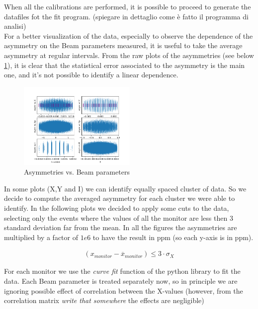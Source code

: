 {When all the calibrations are performed, it is possible to proceed to generate the datafiles fot the fit program. (spiegare in dettaglio come è fatto il programma di analisi)\\
For a better visualization of the data, especially to observe the dependence of the asymmetry on the Beam parameters measured, it is useful to take the average asymmetry at regular intervals. From the raw plots of the asymmetries (see below \ref{fig:asyvsparam}), it is clear that the statistical error associated to the asymmetry is the main one, and it's not possible to identify a linear dependence.

\begin{figure}[hbtp]
\centering
\includegraphics[width = 0.5\textwidth]{Analysis/Asym_vs_monitor.png}
\caption{Asymmetries vs. Beam parameters}
\label{fig:asyvsparam}
\end{figure}

In some plots (X,Y and I) we can identify equally spaced cluster of data. So we decide to compute the averaged asymmetry for each cluster we were able to identify. 
In the following plots we decided to apply some cuts to the data, selecting only the events where the values of all the monitor are less then 3 standard deviation far from the mean. In all the figures the asymmetries are multiplied by a factor of $1e6$ to have the result in ppm (so each y-axis is in ppm). 

\begin{align*}
(x_{monitor} - \overline{x}_{monitor}) \leq 3 \cdot \sigma_{X}
\end{align*}

For each monitor we use the \textit{curve fit} function of the python library  to fit the data. Each Beam parameter is treated separately now, so in principle we are ignoring possible effect of correlation between the X-values (however, from the correlation matrix    \textit{write that somewhere} the effects are negligible)  

}
